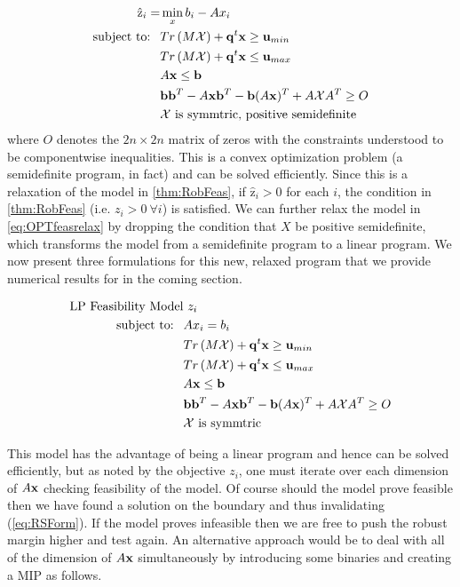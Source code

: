 \documentclass[11pt]{article}
\theoremstyle{plain}
\theoremstyle{definition}
\theoremstyle{remark}
\begin{document}
\begin{subequations}\label{eq:OPTfeasrelax}
\begin{align}
\hat{\mathrm{z}}_{i} = &\min_x b_i-Ax_i  \\
 \text{subject to: } \ &Tr\left(M\mathcal{X}\right)+\bold q^t\bold x \geq \bold u_{min} \\
 & Tr\left(M\mathcal{X}\right)+\bold q^t\bold x \leq \bold u_{max} \\
 	&A\bold x\leq \bold b \\
 	&\bold b\bold b^T-A\bold x\bold b^T-\bold b(A\bold x)^T+A\mathcal{X}A^T\geq O \\
 	&\mathcal{X} \text{ is symmtric, positive semidefinite}
\end{align}
\end{subequations}
where $O$ denotes the $2n \times 2n$ matrix of zeros with the constraints understood to be componentwise inequalities. 
This is a convex optimization problem (a semidefinite program, in fact) and can be solved efficiently. 
Since this is a relaxation of the model in \cref{thm:RobFeas}, if $\hat{\mathrm{z}}_i>0$ for each $i$, the condition in \cref{thm:RobFeas} (i.e. $z_i>0 \ \forall i$) is satisfied. 
We can further relax the model in \eqref{eq:OPTfeasrelax} by dropping the condition that $X$ be positive semidefinite, which transforms the model from a semidefinite program to a linear program. 
We now present three formulations for this new, relaxed program that we provide numerical results for in the coming section.

\begin{subequations}\label{eq:OPTfeasrelaxLP1}
\begin{align}
 \text{LP Feasibility Model}& \ z_i  \\
 \text{subject to: } \ &Ax_i= b_i \\
 &Tr\left(M\mathcal{X}\right)+\bold q^t\bold x \geq \bold u_{min} \\
 & Tr\left(M\mathcal{X}\right)+\bold q^t\bold x \leq \bold u_{max} \\
 	&A\bold x\leq \bold b \\
 	&\bold b\bold b^T-A\bold x\bold b^T-\bold b(A\bold x)^T+A\mathcal{X}A^T\geq O \\
 	&\mathcal{X} \text{ is symmtric}
\end{align}
\end{subequations}

This model has the advantage of being a linear program and hence can be solved efficiently, but as noted by the objective $z_i$, one must iterate over each dimension of $A\bold x$ checking feasibility of the model. 
Of course should the model prove feasible then we have found a solution on the boundary and thus invalidating (\ref{eq:RSForm}). 
If the model proves infeasible then we are free to push the robust margin higher and test again. 
An alternative approach would be to deal with all of the dimension of $A\bold x$ simultaneously by introducing some binaries and creating a MIP as follows. 
\end{document}
